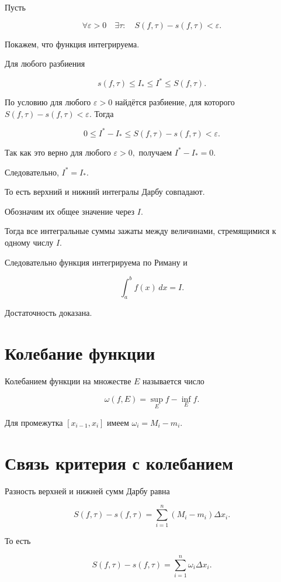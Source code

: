 \documentclass[14pt]{extreport}
\begin{document}
Пусть

\[
\forall\varepsilon>0
\quad
\exists\tau:
\quad
S(f,\tau)-s(f,\tau)<\varepsilon.
\]

Покажем, что функция интегрируема.

Для любого разбиения

\[
s(f,\tau)\le I_*\le I^*\le S(f,\tau).
\]

По условию для любого
$
\varepsilon>0
$
найдётся разбиение, для которого
$
S(f,\tau)-s(f,\tau)<\varepsilon.
$
Тогда

\[
0
\le
I^*-I_*
\le
S(f,\tau)-s(f,\tau)
<
\varepsilon.
\]

Так как это верно для любого $\varepsilon>0,$
получаем
$
I^*-I_*=0.
$

Следовательно,
$
I^*=I_*.
$

То есть верхний и нижний интегралы Дарбу совпадают.

Обозначим их общее значение через
$
I.
$

Тогда все интегральные суммы зажаты между величинами,
стремящимися к одному числу $I$.

Следовательно функция интегрируема по Риману и

\[
\int_a^b f(x)\,dx=I.
\]

Достаточность доказана.

\section{Колебание функции}

\begin{definition}
Колебанием функции на множестве $E$ называется число

\[
\omega(f,E)
=
\sup_E f
-
\inf_E f.
\]

\end{definition}

Для промежутка
$
[x_{i-1},x_i]
$
имеем
$
\omega_i=M_i-m_i.
$

\section{Связь критерия с колебанием}

Разность верхней и нижней сумм Дарбу равна

\[
S(f,\tau)-s(f,\tau)
=
\sum_{i=1}^{n}
(M_i-m_i)\Delta x_i.
\]

То есть

\[
\boxed{
S(f,\tau)-s(f,\tau)
=
\sum_{i=1}^{n}
\omega_i\Delta x_i.
}
\]
\end{document}
